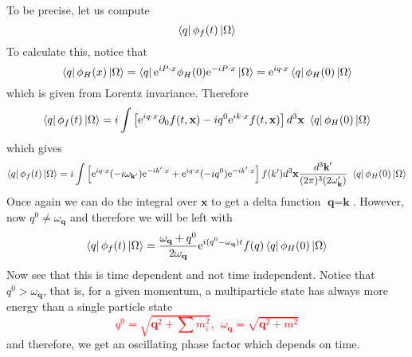 \documentclass[11pt]{article}
\newcommand{\del}{\partial}
\newcommand{\e}{\mathrm{e}}
\newcommand{\w}{\omega}
\numberwithin{equation}{section}
\begin{document}
To be precise, let us compute
\begin{equation*}
    \bra{q} \phi_f(t) \ket{\Omega}
\end{equation*}
To calculate this, notice that 
\begin{equation*}
    \bra{q} \phi_H(x) \ket{\Omega} = \bra{q}\e^{iP\cdot x} \phi_H(0) \e^{-iP\cdot x}\ket{\Omega}=\e^{iq\cdot x} \bra{q} \phi_H(0) \ket{\Omega}
\end{equation*}
which is given from Lorentz invariance. Therefore 
\begin{equation*}
    \bra{q}\phi_f(t)\ket{\Omega} = i \int \left[  \e^{iq\cdot x} \del_0f(t, \textbf{x}) - iq^0\e^{ik\cdot x} f(t, \textbf{x})    \right]d^3\textbf{x}~\bra{q} \phi_H(0) \ket{\Omega}
\end{equation*}
which gives 
\begin{equation*}
    \bra{q}\phi_f(t)\ket{\Omega} = i\int \left[ \e^{iq\cdot x} (-i\w_{\textbf{k}'}) \e^{-ik'\cdot x} + \e^{iq\cdot x} (-iq^0)   \e^{-ik'\cdot x} \right] f({k}') d^3\textbf{x} \frac{d^3\textbf{k}'}{(2\pi)^3(2\w_\textbf{k}')}~\bra{q} \phi_H(0) \ket{\Omega}
\end{equation*}
Once again we can do the integral over \(\textbf{x}\) to get a delta function \(\textbf{q} = \textbf{k}\). However, now \(q^0 \ne \w_\textbf{q}\) and therefore we will be left with 
\begin{equation*}
    \bra{q}\phi_f(t)\ket{\Omega} = \frac{\w_\textbf{q} + q^0}{2\w_\textbf{q}} \e^{i(q^0 - \w_\textbf{q})t} f(q) \bra{q} \phi_H(0) \ket{\Omega}
\end{equation*}
Now see that this is time dependent and not time independent. Notice that \(q^0 > \w_\textbf{q}\), that is, for a given momentum, a multiparticle state has always more energy than a single particle state
\textcolor{red}{
    \begin{equation*}
        q^0 = \sqrt{\textbf{q}^2 + \sum m_i^2},~~\w_\textbf{q} = \sqrt{\textbf{q}^2 + m^2}
    \end{equation*}
}
and therefore, we get an oscillating phase factor which depends on time. \\
\end{document}
